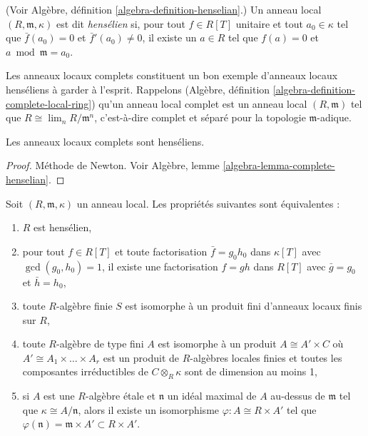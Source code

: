 \begin{definition}
\label{definition-henselian}
(Voir Algèbre, définition \ref{algebra-definition-henselian}.)
Un anneau local $(R, \mathfrak m, \kappa)$ est dit
{\it hens\'elien} si, pour tout
$f \in R[T]$ unitaire et tout $a_0 \in \kappa$ tel que
$\bar f(a_0) = 0$ et $\bar f'(a_0) \neq 0$, il existe
un $a \in R$ tel que $f(a) = 0$ et $a \bmod \mathfrak m = a_0$.
\end{definition}

\noindent
Les anneaux locaux complets constituent un bon exemple
d'anneaux locaux hens\'eliens \`a garder \`a l'esprit.
Rappelons
(Algèbre, définition \ref{algebra-definition-complete-local-ring})
qu'un anneau local complet est un anneau local $(R, \mathfrak m)$ tel que
$R \cong \lim_n R/\mathfrak m^n$, c'est-\`a-dire complet et s\'epar\'e
pour la topologie $\mathfrak m$-adique.

\begin{theorem}
\label{theorem-hensel}
Les anneaux locaux complets sont hens\'eliens.
\end{theorem}

\begin{proof}
M\'ethode de Newton. Voir
Algèbre, lemme \ref{algebra-lemma-complete-henselian}.
\end{proof}

\begin{theorem}
\label{theorem-henselian}
Soit $(R, \mathfrak m, \kappa)$ un anneau local. Les propri\'et\'es suivantes sont \'equivalentes :
\begin{enumerate}
\item $R$ est hens\'elien,
\item pour tout $f\in R[T]$ et toute factorisation $\bar f = g_0 h_0$ dans
$\kappa[T]$ avec $\gcd(g_0, h_0)=1$, il existe une factorisation $f = gh$ dans
$R[T]$ avec $\bar g = g_0$ et $\bar h = h_0$,
\item toute $R$-alg\`ebre finie $S$ est isomorphe \`a un produit fini
d'anneaux locaux finis sur $R$,
\item toute $R$-alg\`ebre de type fini $A$ est isomorphe \`a un produit
$A \cong A' \times C$ o\`u $A' \cong A_1 \times \ldots \times A_r$
est un produit de $R$-alg\`ebres locales finies et toutes les composantes
irr\'eductibles de $C \otimes_R \kappa$ sont de dimension au moins 1,
\item si $A$ est une $R$-alg\`ebre \'etale et $\mathfrak n$ un id\'eal maximal de
$A$ au-dessus de $\mathfrak m$ tel que $\kappa \cong A/\mathfrak n$, alors il
existe un isomorphisme $\varphi : A \cong R \times A'$ tel que
$\varphi(\mathfrak n) = \mathfrak m \times A' \subset R \times A'$.
\end{enumerate}
\end{theorem}

